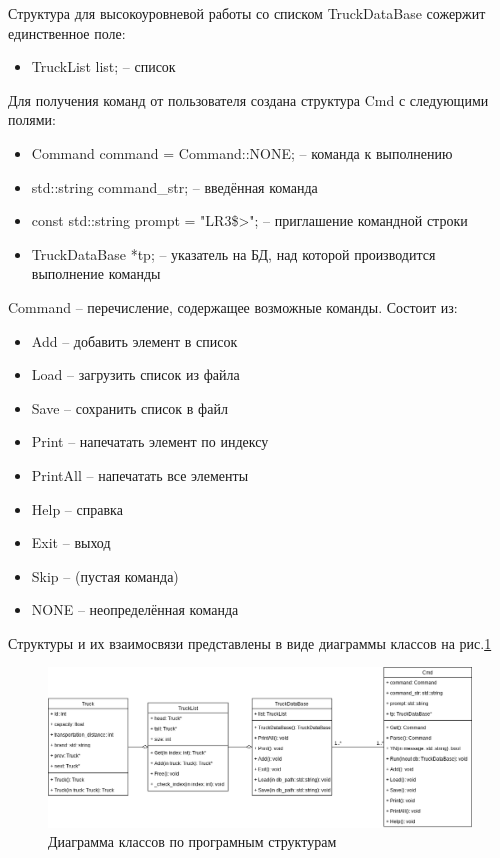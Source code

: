 Структура для высокоуровневой работы со списком TruckDataBase сожержит единственное поле:

\begin{itemize}
    \item TruckList list{}; -- список
\end{itemize}

Для получения команд от пользователя создана структура Cmd с следующими полями:

\begin{itemize}
    \item Command command = Command::NONE; -- команда к выполнению
    \item std::string command\_str{}; -- введённая команда
    \item const std::string prompt = "LR3\$>"; -- приглашение командной строки
    \item TruckDataBase *tp; -- указатель на БД, над которой производится выполнение команды
\end{itemize}

Command -- перечисление, содержащее возможные команды.
Состоит из:

\begin{itemize}
    \item Add -- добавить элемент в список
    \item Load -- загрузить список из файла
    \item Save -- сохранить список в файл
    \item Print -- напечатать элемент по индексу
    \item PrintAll -- напечатать все элементы
    \item Help -- справка
    \item Exit -- выход
    \item Skip -- (пустая команда)
    \item NONE -- неопределённая команда
\end{itemize}

Структуры и их взаимосвязи представлены
в виде диаграммы классов на рис.\ref{class_diagram}

\begin{figure}[htp!]
    \centering
    \includegraphics[width=0.9\linewidth]{photo/class_diagram}
    \caption{Диаграмма классов по програмным структурам}
    \label{class_diagram}
\end{figure}